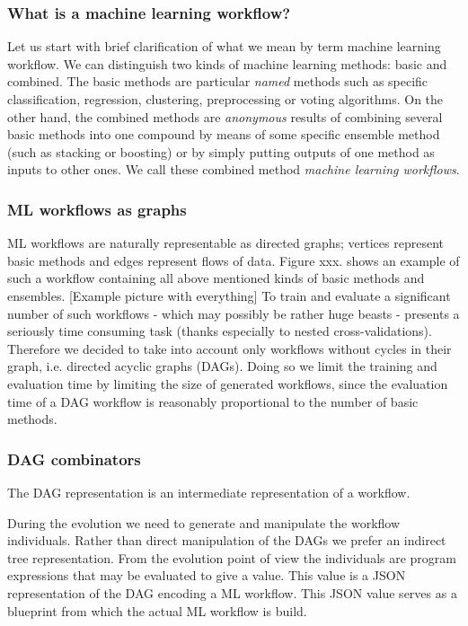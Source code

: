 \documentclass[a4paper,oneside]{memoir}
\begin{document}
\subsubsection{What is a machine learning workflow?}
Let us start with brief clarification of what we mean by term machine learning workflow. We can distinguish two kinds of machine learning methods: basic and combined. The basic methods are particular \textit{named} methods such as specific classification, regression, clustering, preprocessing or voting algorithms. On the other hand, the combined methods are \textit{anonymous} results of combining several basic methods into one compound by means of some specific ensemble method (such as stacking or boosting) or by simply putting outputs of one method as inputs to other ones. We call these combined method \textit{machine learning workflows}.

\subsubsection{ML workflows as graphs}
ML workflows are naturally representable as directed graphs; vertices represent basic methods and edges represent flows of data.
Figure xxx. shows an example of such a workflow containing all above mentioned kinds of basic methods and ensembles.
[Example picture with everything]
To train and evaluate a significant number of such workflows - which may possibly be rather huge beasts -  presents a seriously time consuming task (thanks especially to nested cross-validations). Therefore we decided to take into account only workflows without cycles in their graph, i.e. directed acyclic graphs (DAGs). Doing so we limit the training and evaluation time by limiting the size of generated workflows, since the evaluation time of a DAG workflow is reasonably proportional to the number of basic methods.

\subsubsection{DAG combinators}

The DAG representation is an intermediate representation of a workflow. 

During the evolution we need to generate and manipulate the workflow individuals. Rather than direct manipulation of the DAGs we prefer an indirect tree representation. From the evolution point of view the individuals are program expressions that may be  evaluated to give a value. This value is a JSON representation of the DAG encoding a ML workflow. This JSON value serves as a blueprint from which the actual ML workflow is build.
\end{document}
